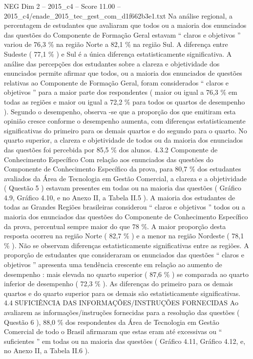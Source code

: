 \begin{textsample}{NEG Dim 2 – 2015\_c4 – Score 11.00 – 2015\_c4/enade\_2015\_tec\_gest\_com\_d1f662b3e1.txt}
Na análise regional, a percentagem de estudantes que avaliaram que todos ou a maioria dos enunciados das questões do Componente de Formação Geral estavam “ claros e objetivos ” variou de 76,3 \% na região Norte a 82,1 \% na região Sul.
A diferença entre Sudeste ( 77,1 \% ) e Sul é a única diferença estatisticamente significativa.
A análise das percepções dos estudantes sobre a clareza e objetividade dos enunciados permite afirmar que todos, ou a maioria dos enunciados de questões relativas ao Componente de Formação Geral, foram considerados “ claros e objetivos ” para a maior parte dos respondentes ( maior ou igual a 76,3 \% em todas as regiões e maior ou igual a 72,2 \% para todos os quartos de desempenho ).
Segundo o desempenho, observa -se que a proporção dos que emitiram esta opinião cresce conforme o desempenho aumenta, com diferenças estatisticamente significativas do primeiro para os demais quartos e do segundo para o quarto.
No quarto superior, a clareza e objetividade de todos ou da maioria dos enunciados das questões foi percebida por 85,5 \% dos alunos. 4.3.2 Componente de Conhecimento Específico Com relação aos enunciados das questões do Componente de Conhecimento Específico da prova, para 80,7 \% dos estudantes avaliados da Área de Tecnologia em Gestão Comercial, a clareza e a objetividade ( Questão 5 ) estavam presentes em todas ou na maioria das questões ( Gráfico 4.9, Gráfico 4.10, e no Anexo II, a Tabela II.5 ).
A maioria dos estudantes de todas as Grandes Regiões brasileiras considerou “ claros e objetivos ” todos ou a maioria dos enunciados das questões do Componente de Conhecimento Específico da prova, percentual sempre maior do que 78 \%.
A maior proporção desta resposta ocorreu na região Norte ( 82,7 \% ) e a menor na região Nordeste ( 78,1 \% ).
Não se observam diferenças estatisticamente significativas entre as regiões.
A proporção de estudantes que consideraram os enunciados das questões “ claros e objetivos ” apresenta uma tendência crescente em relação ao aumento de desempenho : mais elevada no quarto superior ( 87,6 \% ) se comparada ao quarto inferior de desempenho ( 72,3 \% ).
As diferenças do primeiro para os demais quartos e do quarto superior para os demais são estatisticamente significativas. 4.4 SUFICIÊNCIA DAS INFORMAÇÕES/INSTRUÇÕES FORNECIDAS Ao avaliarem as informações/instruções fornecidas para a resolução das questões ( Questão 6 ), 88,0 \% dos respondentes da Área de Tecnologia em Gestão Comercial de todo o Brasil afirmaram que estas eram até excessivas ou “ suficientes ” em todas ou na maioria das questões ( Gráfico 4.11, Gráfico 4.12, e, no Anexo II, a Tabela II.6 ).

\end{textsample}
